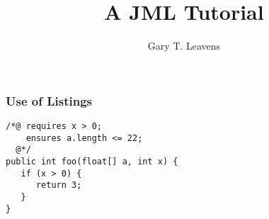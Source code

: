 \documentclass{beamer}
\title{A JML Tutorial}
\author{Gary T. Leavens}
\begin{document}
\begin{frame}
\titlepage
\end{frame}

\begin{frame}[fragile]
\frametitle{Use of Listings}
\begin{lstlisting}
/*@ requires x > 0; 
    ensures a.length <= 22; 
  @*/
public int foo(float[] a, int x) {
   if (x > 0) {
      return 3;
   }
}
\end{lstlisting}
\end{frame}
\end{document}

